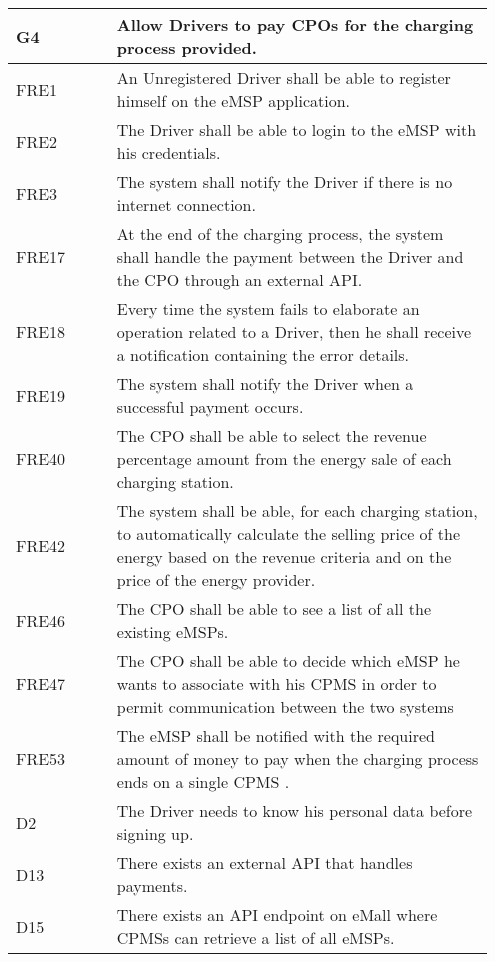 {\renewcommand{\arraystretch}{1.5}
\begin{longtable}{|p{0.20\linewidth}p{0.75\linewidth} |}
    \hline
    \rowcolor{bluepoli!40}\textbf{G4} & \textbf{Allow Drivers to pay CPOs for the charging process provided.} \\
    \hline
    \rowcolor{bluepoli!15} FRE1 & An Unregistered Driver shall be able to register himself on the eMSP application. \\
    \hline
    \rowcolor{bluepoli!15} FRE2 & The Driver shall be able to login to the eMSP with his credentials. \\
    \hline 
    \rowcolor{bluepoli!15} FRE3 & The system shall notify the Driver if there is no internet connection. \\
    \hline 
    \rowcolor{bluepoli!15} FRE17 & At the end of the charging process, the system shall handle the payment between the Driver and the CPO through an external API. \\
    \hline
    \rowcolor{bluepoli!15} FRE18 & Every time the system fails to elaborate an operation related to a Driver, then he shall receive a notification containing the error details. \\
    \hline
    \rowcolor{bluepoli!15} FRE19 & The system shall notify the Driver when a successful payment occurs. \\
    \hline
    \rowcolor{bluepoli!15} FRE40& The CPO shall be able to select the revenue percentage amount from the energy sale of each charging station. \\
    
    \hline
    \rowcolor{bluepoli!15} FRE42 & The system shall be able, for each charging station, to automatically calculate the selling price of the energy based on the revenue criteria and on the price of the energy provider. \\
    \hline
    \rowcolor{bluepoli!15}
    FRE46 & The CPO shall be able to see a list of all the existing eMSPs. \\
    \hline
    \rowcolor{bluepoli!15} FRE47 &  The CPO shall be able to decide which eMSP he wants to associate with his CPMS in order to permit communication between the two systems \\
    \hline
    \rowcolor{bluepoli!15} FRE53 &  The eMSP shall be notified with the required amount of money to pay when the charging process ends on a single CPMS .\\
    \hline
    \rowcolor{bluepoli!5} D2 & The Driver needs to know his personal data before signing up. \\
    \hline 
    \rowcolor{bluepoli!5} D13& There exists an external API that handles payments. \\
    \hline
    \rowcolor{bluepoli!5} D15 & There exists an API endpoint on eMall where CPMSs can retrieve a list of all eMSPs.\\
    \hline  
\end{longtable}}
